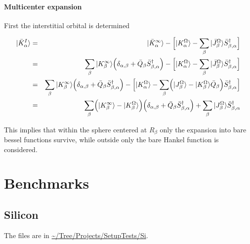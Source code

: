 \documentclass[11pt,a4paper]{report}
\begin{document}
\subsubsection{Multicenter expansion}

First the interstitial orbital is determined

\begin{eqnarray}
|\bar{K}^I_\alpha\rangle&=&|\bar{K}^\infty_\alpha\rangle 
- \Bigl[ |K^\Omega_\alpha\rangle 
-\sum_\beta |\bar{J}^\Omega_\beta\rangle \bar{S}^\dagger_{\beta,\alpha}
\Bigr]
\nonumber\\
&=&\sum_\beta |K^\infty_\beta\rangle \Bigl(\delta_{\alpha,\beta}+\bar{Q}_\beta
\bar{S}^\dagger_{\beta,\alpha}\Bigr)
- \Bigl[ |K^\Omega_\alpha\rangle 
-\sum_\beta |\bar{J}^\Omega_\beta\rangle \bar{S}^\dagger_{\beta,\alpha}
\Bigr]
\nonumber\\
&=&\sum_\beta |K^\infty_\beta\rangle \Bigl(\delta_{\alpha,\beta}+\bar{Q}_\beta
\bar{S}^\dagger_{\beta,\alpha}\Bigr)
- \Bigl[ |K^\Omega_\alpha\rangle 
-\sum_\beta 
\Bigl(
|J^\Omega_\beta\rangle-|K^\Omega_\beta\rangle\bar{Q}_\beta\Bigr)
 \bar{S}^\dagger_{\beta,\alpha}
\Bigr]
\nonumber\\
&=&\sum_\beta 
\Bigl(|K^\infty_\beta\rangle -|K^\Omega_\beta\rangle \Bigr)
\Bigl(\delta_{\alpha,\beta}+\bar{Q}_\beta
\bar{S}^\dagger_{\beta,\alpha}\Bigr)
+\sum_\beta 
|J^\Omega_\beta\rangle\bar{S}^\dagger_{\beta,\alpha}
\end{eqnarray}

This implies that within the sphere centered at $R_\beta$ only the
expansion into bare bessel functions survive, while outside only the
bare Hankel function is considered.




\chapter{Benchmarks}
\section{Silicon}
The files are in \url{~/Tree/Projects/SetupTests/Si}.
\end{document}
